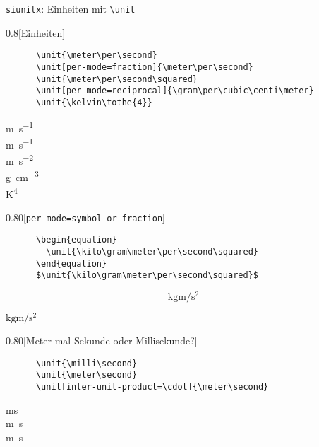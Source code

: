 \begin{frame}[fragile]{\texttt{siunitx}: Einheiten mit \texttt{\backslash unit}}
  \begin{CodeExample}{0.8}[Einheiten]
    \begin{verbatim}
      \unit{\meter\per\second}
      \unit[per-mode=fraction]{\meter\per\second}
      \unit{\meter\per\second\squared}
      \unit[per-mode=reciprocal]{\gram\per\cubic\centi\meter}
      \unit{\kelvin\tothe{4}}
    \end{verbatim}
  \CodeResult
    \strut
    \unit{\meter\per\second} \\
    \unit[per-mode=fraction]{\meter\per\second} \\
    \unit{\meter\per\second\squared} \\
    \unit[per-mode=reciprocal]{\gram\per\cubic\centi\meter} \\
    \unit{\kelvin\tothe{4}}
  \end{CodeExample}
  \begin{CodeExample}{0.80}[\texttt{per-mode=symbol-or-fraction}]
    \begin{verbatim}
      \begin{equation}
        \unit{\kilo\gram\meter\per\second\squared}
      \end{equation}
      $\unit{\kilo\gram\meter\per\second\squared}$
    \end{verbatim}
  \CodeResult
    \removedisplayskip
    \begin{minipage}[c][3\baselineskip][c]{\textwidth}
      \begin{equation}
        \unit{\kilo\gram\meter\per\second\squared}
      \end{equation}
    \end{minipage}
    $\unit{\kilo\gram\meter\per\second\squared}$
  \end{CodeExample}
  \begin{CodeExample}{0.80}[Meter mal Sekunde oder Millisekunde?]
    \begin{verbatim}
      \unit{\milli\second}
      \unit{\meter\second}
      \unit[inter-unit-product=\cdot]{\meter\second}
    \end{verbatim}
  \CodeResult
    \strut
    \unit{\milli\second} \\
    \unit{\meter\second} \\
    \unit[inter-unit-product=\cdot]{\meter\second}
  \end{CodeExample}
\end{frame}

